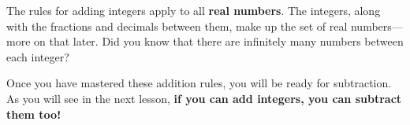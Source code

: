 \documentclass{ximera}[font=12pt]
\begin{document}
The rules for adding integers apply to all \textbf{real numbers}.  The integers, along with the fractions and 
decimals between them, make up the set of real numbers—more on that later.  Did you know that there are infinitely 
many numbers between each integer? 

Once you have mastered these addition rules, you will be ready for subtraction.  As you will see in the next lesson, 
\textbf{if you can add integers, you can subtract them too!}
\end{document}
